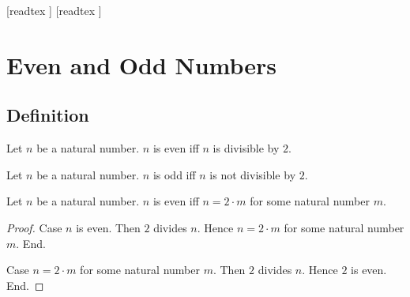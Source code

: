 \documentclass[10pt]{article}
\begin{document}
  \begin{imports}
    \begin{forthel}
      [readtex ]
      [readtex ]
    \end{forthel}
  \end{imports}


  \section*{Even and Odd Numbers}

  \subsection*{Definition}

  \begin{forthel}
    \begin{definition}[id=ARITHMETIC_15_4521358965847512,printid]
      Let $n$ be a natural number.
      $n$ is even iff $n$ is divisible by $2$.
    \end{definition}
  \end{forthel}

  \begin{forthel}
    \begin{definition}[id=ARITHMETIC_15_1023652125874596,printid]
      Let $n$ be a natural number.
      $n$ is odd iff $n$ is not divisible by $2$.
    \end{definition}
  \end{forthel}

  \begin{forthel}
    \begin{proposition}[id=ARITHMETIC_15_0236985458752156,printid]
      Let $n$ be a natural number.
      $n$ is even iff $n = 2 \cdot m$ for some natural number $m$.
    \end{proposition}
    \begin{proof}
      Case $n$ is even.
        Then $2$ divides $n$.
        Hence $n = 2 \cdot m$ for some natural number $m$.
      End.

      Case $n = 2 \cdot m$ for some natural number $m$.
        Then $2$ divides $n$.
        Hence $2$ is even.
      End.
    \end{proof}
  \end{forthel}
\end{document}
